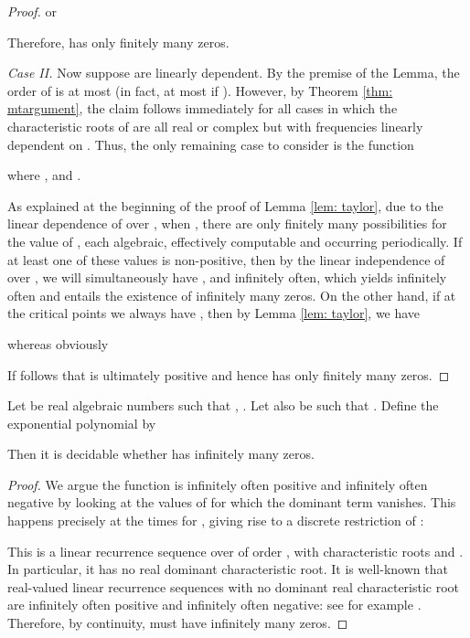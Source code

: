 \begin{proof}
or

Therefore,  has only finitely many zeros.


\emph{Case II.} Now suppose  are linearly dependent. By the premise of
the Lemma, the order of  is at most  (in fact, 
at most  if ). However, by Theorem \ref{thm: mtargument}, the claim follows immediately
for all cases in which the characteristic roots of  are all real
or complex but with frequencies linearly dependent on . Thus, the only remaining
case to consider is the function

where ,  and .

As explained at the beginning of the proof of Lemma \ref{lem: taylor}, due to the linear
dependence of  over , when , there are only finitely
many possibilities for the value of , each algebraic, effectively
computable and occurring periodically. If at least one of these values is non-positive,
then by the linear independence of  over , we will simultaneously have 
,  and 
infinitely often, which yields  infinitely often and entails the existence of
infinitely many zeros. On the other hand, if at the critical points 
we always have , then by Lemma \ref{lem: taylor}, we have 

whereas obviously 

If follows that  is ultimately positive and hence has only finitely many zeros.
\end{proof}


\begin{lemma}\label{lem: oneOscTwo}
Let  be real algebraic numbers such that 
,  .
Let also  be
such that
.  
Define the exponential polynomial  by

Then it is decidable whether  has infinitely many
zeros. 
\end{lemma}
\begin{proof}
We argue the function is infinitely often positive and infinitely often negative
by looking at the values of  for which the dominant term 
vanishes. This happens precisely at the times  for ,
giving rise to a discrete restriction of :

This is a linear recurrence sequence over  of order , 
with characteristic roots  and . 
In particular, it has no real dominant characteristic root. It is well-known 
that real-valued  linear recurrence sequences with no dominant real 
characteristic root are infinitely often positive and infinitely often negative:
see for example \cite[Theorem 7.1.1]{gyori}. Therefore, by continuity, 
 must have infinitely many zeros.
\end{proof}


